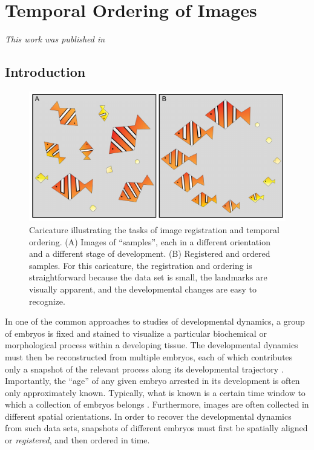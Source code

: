 
\chapter{Temporal Ordering of Images \label{ch:drosophila}}

\graphicspath{{ch-drosophila/figures/}}

{\em This work was published in \citep{dsilva2015temporal}}

\section{Introduction}

\begin{figure}[t]
\centering
\includegraphics{fig1}
\caption[Caricature illustrating the tasks of image registration and temporal ordering]{Caricature illustrating the tasks of image registration and temporal ordering. (A) Images of ``samples'', each in a different orientation and a different stage of development. (B) Registered and ordered samples. For this caricature, the registration and ordering is straightforward because the data set is small, the landmarks are visually apparent, and the developmental changes are easy to recognize.}
\label{fig:fish}
\end{figure}

In one of the common approaches to studies of developmental dynamics, a group of embryos is fixed and stained to visualize a particular biochemical or morphological process within a developing tissue.
%
The developmental dynamics must then be reconstructed from multiple embryos, each of which contributes only a snapshot of the relevant process along its developmental trajectory \citep{jaeger2004dynamic, peter2011gene, fowlkes2008quantitative}.
%
Importantly, the ``age'' of any given embryo arrested in its development is often only approximately known.
%
Typically, what is known is
a certain time window to which a collection of embryos belongs \citep{ng2012large, richardson2014emage, castro2009automatic}.
%
Furthermore, images are often collected in different spatial orientations.
%
In order to recover the developmental dynamics from such data sets, snapshots of different embryos must first be spatially aligned or {\em registered}, and then ordered in time.


